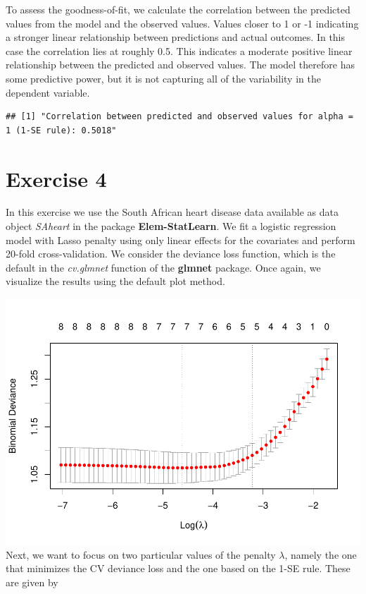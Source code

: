 \documentclass[
]{article}
\begin{document}
To assess the goodness-of-fit, we calculate the correlation between the
predicted values from the model and the observed values. Values closer
to 1 or -1 indicating a stronger linear relationship between predictions
and actual outcomes. In this case the correlation lies at roughly 0.5.
This indicates a moderate positive linear relationship between the
predicted and observed values. The model therefore has some predictive
power, but it is not capturing all of the variability in the dependent
variable.

\begin{verbatim}
## [1] "Correlation between predicted and observed values for alpha = 1 (1-SE rule): 0.5018"
\end{verbatim}

\newpage

\hypertarget{exercise-4}{%
\section{Exercise 4}\label{exercise-4}}

In this exercise we use the South African heart disease data available
as data object \textit{SAheart} in the package \textbf{Elem-StatLearn}.
We fit a logistic regression model with Lasso penalty using only linear
effects for the covariates and perform 20-fold cross-validation. We
consider the deviance loss function, which is the default in the
\textit{cv.glmnet} function of the \textbf{glmnet} package. Once again,
we visualize the results using the default plot method.

\includegraphics{A2_files/figure-latex/unnamed-chunk-12-1.pdf} Next, we
want to focus on two particular values of the penalty \(\lambda\),
namely the one that minimizes the CV deviance loss and the one based on
the 1-SE rule. These are given by
\end{document}
